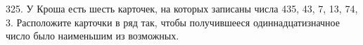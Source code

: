 325. У Кроша есть шесть карточек, на которых записаны числа 435, 43, 7, 13, 74, 3. Расположите карточки в ряд так, чтобы получившееся одиннадцатизначное число было наименьшим из возможных.\\
